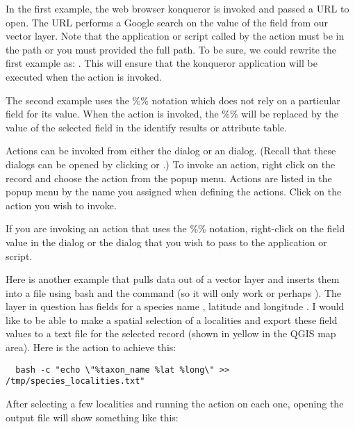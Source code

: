 In the first example, the web browser konqueror is invoked and passed a URL to
open. The URL performs a Google search on the value of the  field
from our vector layer. Note that the application or script called by the
action must be in the path or you must provided the full path. To be sure, we could
rewrite the first example as: . This will ensure that the konqueror
application will be executed when the action is invoked.

The second example uses the \%\% notation which does not rely on a particular
field for its value. When the action is invoked, the \%\% will be replaced by
the value of the selected field in the identify results or attribute table.

\label{label_usingactions}
Actions can be invoked from either the  dialog or an
  dialog. 
(Recall that these dialogs can be opened by clicking
or
.)
To invoke an action, 
right click on the
record and choose the action from the popup menu. Actions are listed in the popup
menu by the name you assigned when defining the actions. Click on the action you
wish to invoke.

If you are invoking an action that uses the \%\% notation, right-click on the
field value in the  dialog or the
 dialog that you wish to pass to the application or script.

Here is another example that pulls data out of a vector layer and inserts them
into a file using bash and the  command (so it will only work
\nix or perhaps \osx). The layer in question has fields for a species name
, latitude  and longitude
. I would like to be able to
make a spatial selection of a localities and export these field values to a
text file for the selected record (shown in yellow in the QGIS map area). Here is
the action to achieve this:

\begin{verbatim}
  bash -c "echo \"%taxon_name %lat %long\" >> /tmp/species_localities.txt"
\end{verbatim} 

After selecting a few localities and running the action on each one, opening
the output file will show something like this:

